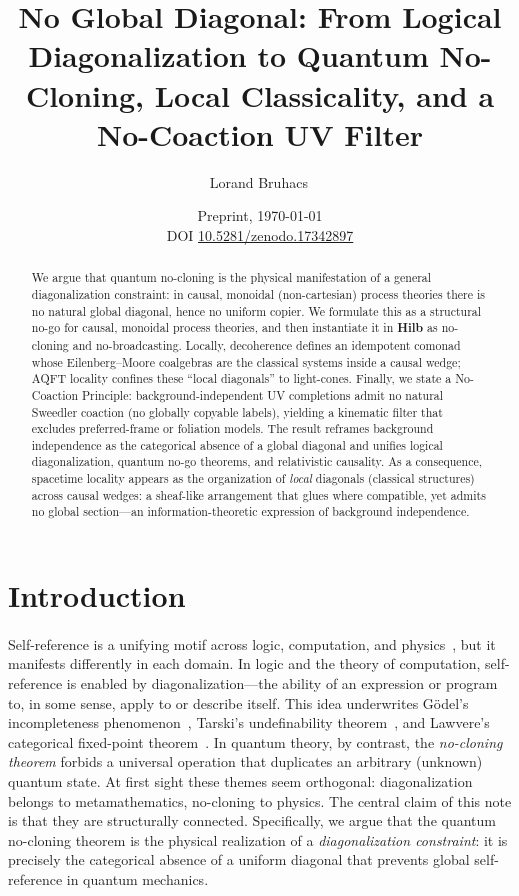 \documentclass[11pt]{article}
\title{No Global Diagonal: From Logical Diagonalization to Quantum No-Cloning, Local Classicality, and a No-Coaction UV Filter}
\author{Lorand Bruhacs\,\orcidlink{0009-0004-6751-0715}}
\date{\normalsize Preprint, \today \\ DOI \href{https://doi.org/10.5281/zenodo.17342897}{10.5281/zenodo.17342897}}
\theoremstyle{upright}
\begin{document}
\maketitle

\begin{abstract}
We argue that quantum no-cloning is the physical manifestation of a general diagonalization constraint: in causal, monoidal (non-cartesian) process theories there is no natural global diagonal, hence no uniform copier. We formulate this as a structural no-go for causal, monoidal process theories, and then instantiate it in \textbf{Hilb} as no-cloning and no-broadcasting.
Locally, decoherence defines an idempotent comonad whose Eilenberg--Moore coalgebras are the classical systems inside a causal wedge; AQFT locality confines these ``local diagonals'' to light-cones. Finally, we state a No-Coaction Principle: background-independent UV completions admit no natural Sweedler coaction (no globally copyable labels), yielding a kinematic filter that excludes preferred-frame or foliation models. The result reframes background independence as the categorical absence of a global diagonal and unifies logical diagonalization, quantum no-go theorems, and relativistic causality. As a consequence, spacetime locality appears as the organization of \emph{local} diagonals (classical structures) across causal wedges: a sheaf-like arrangement that glues where compatible, yet admits no global section—an information-theoretic expression of background independence.

\end{abstract}

\tableofcontents

\section{Introduction}
\label{sec:intro}

\paragraph{}
Self-reference is a unifying motif across logic, computation, and physics~\cite{BaezStay2011}, but it manifests differently in each domain. In logic and the theory of computation, self-reference is enabled by diagonalization---the ability of an expression or program to, in some sense, apply to or describe itself. This idea underwrites Gödel's incompleteness phenomenon~\cite{Godel1931}, Tarski's undefinability theorem~\cite{Tarski1936}, and Lawvere's categorical fixed-point theorem~\cite{Lawvere1969}. In quantum theory, by contrast, the \emph{no-cloning theorem} forbids a universal operation that duplicates an arbitrary (unknown) quantum state. At first sight these themes seem orthogonal: diagonalization belongs to metamathematics, no-cloning to physics. The central claim of this note is that they are structurally connected. Specifically, we argue that the quantum no-cloning theorem is the physical realization of a \emph{diagonalization constraint}: it is precisely the categorical absence of a uniform diagonal that prevents global self-reference in quantum mechanics.
\end{document}

